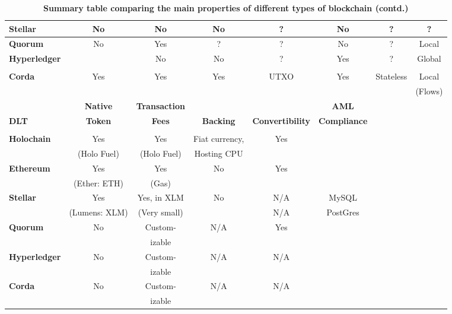 \begin{table}
\begin{centering}
{\begin{tabular}{| l | c | c | c | c | c | c | c |}
\textbf{Stellar}		&No					&No			&No 		&?				&No
				&?					&? \\
\hline
\textbf{Quorum} 	&No					&Yes			&? 		&?				&No
				&?					&Local \\
\hline
\textbf{Hyperledger}	&					&No			&No 		&?				&Yes
				&?					&Global \\
 				&					&			& 		&				&
				&					& \\
\hline
\textbf{Corda} 		&Yes					&Yes			&Yes		&UTXO			&Yes	
				&Stateless			&Local \\
				&					&			&		&				&		
				&					&(Flows) \\
\hline
\hline
\hline
\hline
				& \textbf{Native} 		& \textbf{Transaction}&\textbf{}
				& \textbf{}  			& \textbf{AML}  		& \textbf{} 		& \\
\textbf{DLT}		& \textbf{Token} 		& \textbf{Fees}		&\textbf{Backing} 
				& \textbf{Convertibility}	& \textbf{Compliance} & \textbf{} 		& \textbf{} \\
				& \textbf{} 				& \textbf{}			&\textbf{}
				& \textbf{} 				& \textbf{} 			& \textbf{} 		&\\
\hline
\hline
\textbf{Holochain}	&Yes			&Yes			& Fiat currency,
				&Yes			&			&				& \\
				&(Holo Fuel)	&(Holo Fuel)	&Hosting CPU
				& 			&			&				& \\
\hline
\textbf{Ethereum}	&Yes			&Yes			&No 
				&Yes			&			&				& \\
				&(Ether: ETH)		&(Gas)		& 
				& 			&			&				& \\
\hline

\textbf{Stellar}		&Yes			&Yes, in XLM	&No
				&N/A			&MySQL		&				&\\
				&(Lumens: XLM)&(Very small)	&
				&N/A			&PostGres	&				&\\				
\hline
\textbf{Quorum} 	&No			&Custom-		&N/A
				&Yes			&			&				&\\
			 	&			&izable		&
				& 			&			&				& \\
\hline
\textbf{Hyperledger}	&No			&Custom-		&N/A
				&N/A			&			&				&\\
 				&			&izable		&
				&			&			&				& \\
\hline
\textbf{Corda} 		&No			&Custom-			&N/A
				&N/A			&			&				& \\
		 		&			&izable		&
				& 			&			&				& \\
\hline
\end{tabular}}
\caption{\bf \small Summary table comparing the main properties of different types of blockchain (contd.)}
\label{blockchain_types2}
\end{centering}
\end{table}


